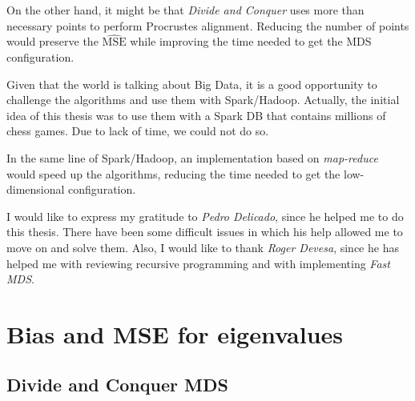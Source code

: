\documentclass[11pt]{report}
\begin{document}
\indent On the other hand, it might be that \textit{Divide and Conquer} uses
more than necessary points to perform Procrustes alignment. Reducing the
number of points would preserve the $\widehat{\mbox{MSE}}$ while improving the
time needed to get the MDS configuration.

\indent Given that the world is talking about Big Data, it is a good 
opportunity to challenge the algorithms and use them with Spark/Hadoop. 
Actually, the initial idea of this thesis was to use them with a Spark DB that 
contains millions of chess games. Due to lack of time, we could not do so. 

\indent In the same line of Spark/Hadoop, an implementation based on 
\textit{map-reduce} would speed up the algorithms, reducing the time needed
to get the low-dimensional configuration. \\


I would like to express my gratitude to \textit{Pedro Delicado}, since he helped
me to do this thesis. There have been some difficult issues in which his help
allowed me to move on and solve them. Also, I would like to thank
\textit{Roger Devesa}, since he has helped me with reviewing recursive 
programming and with implementing \textit{Fast MDS}.







\appendix 




\chapter{Bias and MSE for eigenvalues}
\section{Divide and Conquer MDS}
\label{chap:mes}
\end{document}
